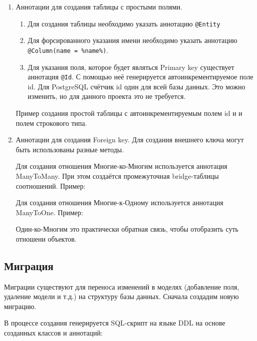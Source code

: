 \documentclass[a4paper]{article}
\begin{document}
\begin{enumerate}
	\item Аннотации для создания таблицы с простыми полями.
	\begin{enumerate}
		\item Для создания таблицы необходимо указать аннотацию \lstinline[]|@Entity|
		\item Для форсированного указания имени необходимо указать аннотацию \lstinline[]|@Column(name = %name%)|.
		\item Для указания поля, которое будет являться Primary key существует аннотация \lstinline[]|@Id|. С помощью неё генерируется автоинкрементируемое поле id. Для PostgreSQL счётчик id один для всей базы данных. Это можно изменить, но для данного проекта это не требуется.
	\end{enumerate}

	Пример создания простой таблицы с автоинкрементируемым полем id и и полем строкового типа. 
	
	\item Аннотации для создания Foreign key.
	Для создания внешнего ключа могут быть использованы разные методы. 
	
	Для создания отношения Многие-ко-Многим используется аннотация ManyToMany. При этом создаётся промежуточная bridge-таблицы соотношений. Пример:
	
	
	Для создания отношения Многие-к-Одному используется аннотация ManyToOne. Пример:
	
	
	Один-ко-Многим это практически обратная связь, чтобы отобразить суть отношени объектов.
\end{enumerate}

\subsection{Миграция}
Миграции существуют для переноса изменений в моделях (добавление поля, удаление модели и т.д.) на структуру базы данных.
Сначала создадим новую миграцию.

В процессе создания генерируется SQL-скрипт на языке DDL на основе созданных классов и аннотаций: 

\end{document}
